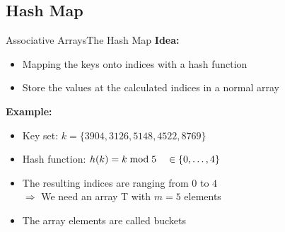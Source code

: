 \subsection{Hash Map}

\begin{frame}{Associative Arrays}{The Hash Map}
  \textbf{Idea:}
  \begin{itemize}
    \item
      Mapping the keys onto indices with a {\color{Mittel-Blau}hash function}
    \item
      Store the values at the calculated indices in a normal array
  \end{itemize}
  \textbf{Example:}
  \begin{itemize}
    \item
      Key set: $k = \{3904, 3126, 5148, 4522, 8769\}$
    \item
      Hash function:
      $h(k) = k \;\mathrm{mod}\; 5 \hspace*{1.0em} \in \{0, \ldots, 4\}$
    \item
      The resulting indices are ranging from $0$ to $4$\\
      $\Rightarrow$ We need an array T with $m = 5$ elements
    \item
      The array elements are called {\color{Mittel-Blau}buckets}
  \end{itemize}
\end{frame}


